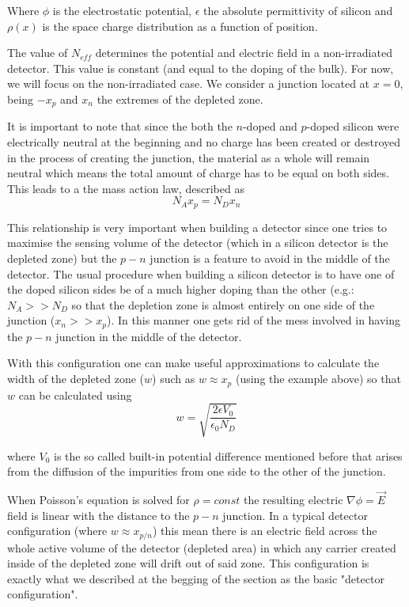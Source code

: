 Where $\phi$ is the electrostatic potential, $\epsilon$ the absolute permittivity of silicon and $\rho(x)$ is the space charge distribution as a function of position.

The value of $N_{eff}$ determines the potential and electric field in a non-irradiated detector. This value is constant (and equal to the doping of the bulk). For now, we will focus on the non-irradiated case. We consider a junction located at $x=0$, being $-x_p$ and $x_n$ the extremes of the depleted zone.

It is important to note that since the both the $n$-doped and $p$-doped silicon were electrically neutral at the beginning and no charge has been created or destroyed in the process of creating the junction, the material as a whole will remain neutral which means the total amount of charge has to be equal on both sides. This leads to a the mass action law, described as \[N_A x_p = N_D x_n\] 

This relationship is very important when building a detector since one tries to maximise the sensing volume of the detector (which in a silicon detector is the depleted zone) but the $p-n$ junction is a feature to avoid in the middle of the detector. The usual procedure when building a silicon detector is to have one of the doped silicon sides be of a much higher doping than the other (e.g.: $N_A >> N_D$  so that the depletion zone is almost entirely on one side of the junction ($x_n >> x_p$). In this manner one gets rid of the mess involved in having the $p-n$ junction in the middle of the detector.

With this configuration one can make useful approximations to calculate the width of the depleted zone ($w$) such as $w \approx x_p$  (using the example above) so that $w$ can be calculated using 
\begin{equation}
w = \sqrt{\frac{2\epsilon V_0}{\epsilon_0 N_D}}
\label{eq:width}
\end{equation}

where $V_0$ is the so called built-in potential difference mentioned before that arises from the diffusion of the impurities from one side to the other of the junction.

When Poisson's equation is solved for $\rho = const$ the resulting electric $\nabla \phi = \vec{E}$ field is linear with the distance to the $p-n$ junction. In a typical detector configuration (where $w \approx x_{p/n}$) this mean there is an electric field across the whole active volume of the detector (depleted area) in which any carrier created inside of the depleted zone will drift out of said zone. This configuration is exactly what we described at the begging of the section as the basic "detector configuration". 

